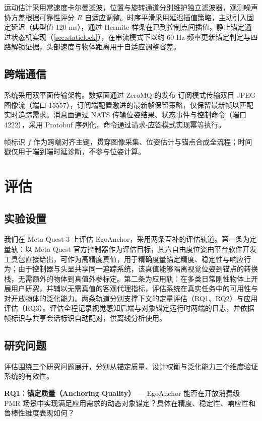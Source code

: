 \documentclass[review]{vgtc}
\begin{document}
运动估计采用常速度卡尔曼滤波，位置与旋转通道分别维护独立滤波器，观测噪声协方差根据可靠性评分 $R$ 自适应调整。时序平滑采用延迟插值策略，主动引入固定延迟（典型值 120 ms），通过 Hermite 样条在已到控制点间插值。静止锚定通过状态机实现（\ref{sec:staticlock}），在串流模式下以约 60 Hz 频率更新锚定判定与四路解锁证据，头部速度与物体距离用于自适应调整容差。

\subsection{跨端通信}


系统采用双平面传输架构。数据面通过 ZeroMQ 的发布-订阅模式传输双目 JPEG 图像流（端口 15557），订阅端配置激进的最新帧保留策略，仅保留最新帧以匹配实时追踪需求。消息面通过 NATS 传输位姿结果、状态事件与控制命令（端口 4222），采用 Protobuf 序列化，命令通过请求-应答模式实现幂等执行。

帧标识 $f$ 作为跨端对齐主键，贯穿图像采集、位姿估计与锚点合成全流程；时间戳仅用于端到端时延诊断，不参与位姿计算。

\section{评估}\label{sec:eval}


\subsection{实验设置}


我们在 Meta Quest 3 上评估 EgoAnchor，采用两条互补的评估轨道。第一条为定量轨：以 Meta Quest 官方控制器作为评估目标，其六自由度位姿由平台软件开发工具包直接给出，可作为高精度真值，用于精确度量锚定精度、稳定性与响应行为；由于控制器与头显共享同一追踪系统，该真值能够隔离视觉位姿到锚点的转换栈，无需额外的物体到真值外参标定。第二条为应用轨：在多类日常刚性物体上开展用户研究，并辅以无需真值的客观代理指标，评估系统在真实任务中的可用性与对开放物体的泛化能力。两条轨道分别支撑下文的定量评估（RQ1、RQ2）与应用评估（RQ3）。评估全程记录视觉感知后端与对象锚定运行时两端的日志，并依据帧标识与共享会话标识自动配对，供离线分析使用。

\subsection{研究问题}


评估围绕三个研究问题展开，分别从锚定质量、设计权衡与泛化能力三个维度验证系统的有效性。

\textbf{RQ1：锚定质量（Anchoring Quality）} --- EgoAnchor 能否在开放消费级 PMR 场景中实现满足应用需求的动态对象锚定？具体在精度、稳定性、响应性和鲁棒性维度表现如何？
\end{document}
